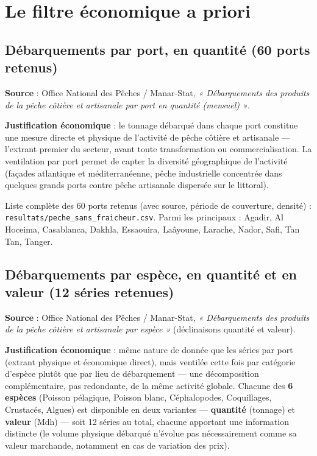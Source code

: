 \documentclass[11pt,a4paper]{article}
\begin{document}
\section{Le filtre économique a priori}

\subsection{Débarquements par port, en quantité (60 ports retenus)}

\textbf{Source} : Office National des Pêches / Manar-Stat, \textit{« Débarquements des produits de la pêche côtière et artisanale par port en quantité (mensuel) »}.

\textbf{Justification économique} : le tonnage débarqué dans chaque port constitue une mesure directe et physique de l'activité de pêche côtière et artisanale --- l'extrant premier du secteur, avant toute transformation ou commercialisation. La ventilation par port permet de capter la diversité géographique de l'activité (façades atlantique et méditerranéenne, pêche industrielle concentrée dans quelques grands ports contre pêche artisanale dispersée sur le littoral).

\begin{fichierbox}
Liste complète des 60 ports retenus (avec source, période de couverture, densité) : \texttt{resultats/peche\_sans\_fraicheur.csv}. Parmi les principaux : Agadir, Al Hoceima, Casablanca, Dakhla, Essaouira, Laâyoune, Larache, Nador, Safi, Tan Tan, Tanger.
\end{fichierbox}

\subsection{Débarquements par espèce, en quantité et en valeur (12 séries retenues)}

\textbf{Source} : Office National des Pêches / Manar-Stat, \textit{« Débarquements des produits de la pêche côtière et artisanale par espèce »} (déclinaisons quantité et valeur).

\textbf{Justification économique} : même nature de donnée que les séries par port (extrant physique et économique direct), mais ventilée cette fois par catégorie d'espèce plutôt que par lieu de débarquement --- une décomposition complémentaire, pas redondante, de la même activité globale. Chacune des \textbf{6 espèces} (Poisson pélagique, Poisson blanc, Céphalopodes, Coquillages, Crustacés, Algues) est disponible en deux variantes --- \textbf{quantité} (tonnage) et \textbf{valeur} (Mdh) --- soit 12 séries au total, chacune apportant une information distincte (le volume physique débarqué n'évolue pas nécessairement comme sa valeur marchande, notamment en cas de variation des prix).
\end{document}
